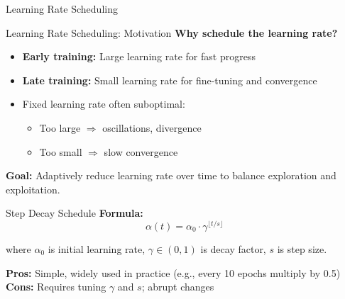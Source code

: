 \documentclass{beamer}
\begin{document}
\begin{frame}
	\centering
	\Huge Learning Rate Scheduling

\end{frame}

\begin{frame}{Learning Rate Scheduling: Motivation}
\textbf{Why schedule the learning rate?}
\begin{itemize}
    \item \textbf{Early training:} Large learning rate for fast progress
    \item \textbf{Late training:} Small learning rate for fine-tuning and convergence
    \item Fixed learning rate often suboptimal:
    \begin{itemize}
        \item Too large $\Rightarrow$ oscillations, divergence
        \item Too small $\Rightarrow$ slow convergence
    \end{itemize}
\end{itemize}

\vspace{0.3cm}

\textbf{Goal:} Adaptively reduce learning rate over time to balance exploration and exploitation.
\end{frame}

\begin{frame}{Step Decay Schedule}
\textbf{Formula:}
$$\alpha(t) = \alpha_0 \cdot \gamma^{\lfloor t/s \rfloor}$$

where $\alpha_0$ is initial learning rate, $\gamma \in (0,1)$ is decay factor, $s$ is step size.

\vspace{0.3cm}

\begin{center}
\end{center}

\textbf{Pros:} Simple, widely used in practice (e.g., every 10 epochs multiply by 0.5)\\
\textbf{Cons:} Requires tuning $\gamma$ and $s$; abrupt changes
\end{frame}
\end{document}
